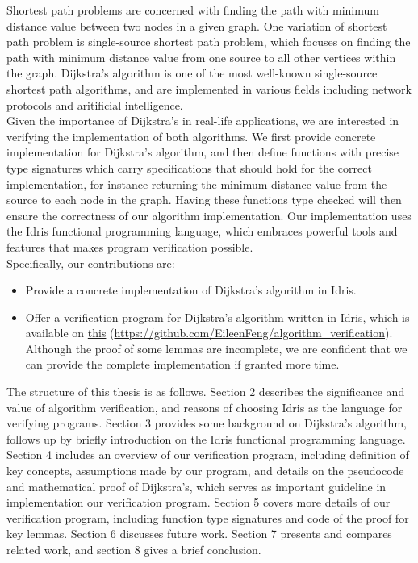 
Shortest path problems are concerned with finding the path with minimum distance value between two nodes in a given graph. One variation of shortest path problem is single-source shortest path problem, which focuses on finding the path with minimum distance value from one source to all other vertices within the graph. Dijkstra's algorithm \cite{Dijkstras} is one of the most well-known single-source shortest path algorithms, and are implemented in various fields including network protocols and aritificial intelligence.
\\

Given the importance of Dijkstra's in real-life applications, we are interested in verifying the implementation of both algorithms. We first provide concrete implementation for Dijkstra's algorithm, and then define functions with precise type signatures which carry specifications that should hold for the correct implementation, for instance returning the minimum distance value from the source to each node in the graph. Having these functions type checked will then ensure the correctness of our algorithm implementation. Our implementation uses the Idris functional programming language, which embraces powerful tools and features that makes program verification possible. 
\\

Specifically, our contributions are:
\begin{itemize}
	\item Provide a concrete implementation of Dijkstra's algorithm in Idris. 
	\item Offer a verification program for Dijkstra's algorithm written in Idris, which is available on \href{https://github.com/EileenFeng/algorithm_verification}{this} (\url{https://github.com/EileenFeng/algorithm_verification}). Although the proof of some lemmas are incomplete, we are confident that we can provide the complete implementation if granted more time.

\end{itemize}

The structure of this thesis is as follows. Section 2 describes the significance and value of algorithm verification, and reasons of choosing Idris as the language for verifying programs. Section 3 provides some background on Dijkstra's algorithm, follows up by briefly introduction on the Idris functional programming language. Section 4 includes an overview of our verification program, including definition of key concepts, assumptions made by our program, and details on the pseudocode and mathematical proof of Dijkstra's, which serves as important guideline in implementation our verification program. Section 5 covers more details of our verification program, including function type signatures and code of the proof for key lemmas. Section 6 discusses future work. Section 7 presents and compares related work, and section 8 gives a brief conclusion.  
